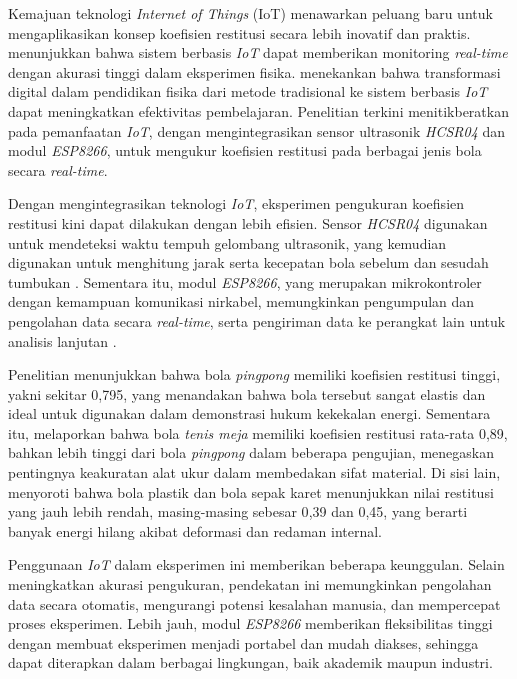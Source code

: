  Kemajuan teknologi \textit{Internet of Things} (IoT) menawarkan peluang baru untuk mengaplikasikan konsep koefisien restitusi secara lebih inovatif dan praktis. \citep{zhang2021iot} menunjukkan bahwa sistem berbasis \textit{IoT} dapat memberikan monitoring \textit{real-time} dengan akurasi tinggi dalam eksperimen fisika. \citep{anderson2019digital} menekankan bahwa transformasi digital dalam pendidikan fisika dari metode tradisional ke sistem berbasis \textit{IoT} dapat meningkatkan efektivitas pembelajaran. Penelitian terkini menitikberatkan pada pemanfaatan \textit{IoT}, dengan mengintegrasikan sensor ultrasonik \textit{HCSR04} dan modul \textit{ESP8266}, untuk mengukur koefisien restitusi pada berbagai jenis bola secara \textit{real-time}.

 Dengan mengintegrasikan teknologi \textit{IoT}, eksperimen pengukuran koefisien restitusi kini dapat dilakukan dengan lebih efisien. Sensor \textit{HCSR04} digunakan untuk mendeteksi waktu tempuh gelombang ultrasonik, yang kemudian digunakan untuk menghitung jarak serta kecepatan bola sebelum dan sesudah tumbukan \citep{sadiku2015elements}. Sementara itu, modul \textit{ESP8266}, yang merupakan mikrokontroler dengan kemampuan komunikasi nirkabel, memungkinkan pengumpulan dan pengolahan data secara \textit{real-time}, serta pengiriman data ke perangkat lain untuk analisis lanjutan \citep{monk2016programming}.

 Penelitian \citep{juita2020penentuan} menunjukkan bahwa bola \textit{pingpong} memiliki koefisien restitusi tinggi, yakni sekitar 0{,}795, yang menandakan bahwa bola tersebut sangat elastis dan ideal untuk digunakan dalam demonstrasi hukum kekekalan energi. Sementara itu, \citep{izzuddin2015menentukan} melaporkan bahwa bola \textit{tenis meja} memiliki koefisien restitusi rata-rata 0{,}89, bahkan lebih tinggi dari bola \textit{pingpong} dalam beberapa pengujian, menegaskan pentingnya keakuratan alat ukur dalam membedakan sifat material. Di sisi lain, \citep{clarania2012koefisien} menyoroti bahwa bola plastik dan bola sepak karet menunjukkan nilai restitusi yang jauh lebih rendah, masing-masing sebesar 0{,}39 dan 0{,}45, yang berarti banyak energi hilang akibat deformasi dan redaman internal.

 Penggunaan \textit{IoT} dalam eksperimen ini memberikan beberapa keunggulan. Selain meningkatkan akurasi pengukuran, pendekatan ini memungkinkan pengolahan data secara otomatis, mengurangi potensi kesalahan manusia, dan mempercepat proses eksperimen. Lebih jauh, modul \textit{ESP8266} memberikan fleksibilitas tinggi dengan membuat eksperimen menjadi portabel dan mudah diakses, sehingga dapat diterapkan dalam berbagai lingkungan, baik akademik maupun industri.

